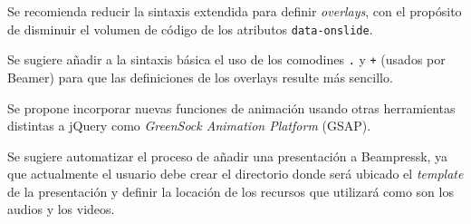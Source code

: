 \begin{recomendations}

	Se recomienda reducir la sintaxis extendida para definir \textit{overlays}, con el propósito de disminuir el volumen de código de los atributos \texttt{data-onslide}.

	Se sugiere añadir a la sintaxis básica el uso de los comodines \texttt{.} y \texttt{+} (usados por Beamer) para que las definiciones de los overlays resulte más sencillo. 

	Se propone incorporar nuevas funciones de animación usando otras herramientas distintas a jQuery como \textit{GreenSock Animation Platform} (GSAP). 

	Se sugiere automatizar el proceso de añadir una presentación a Beampressk, ya que actualmente el usuario debe crear el directorio donde será ubicado el \textit{template} de la presentación y definir la locación de los recursos que utilizará como son los audios y los videos.

	

\end{recomendations}
